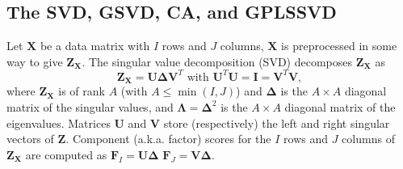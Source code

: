 \documentclass[12pt]{article}
\begin{document}
\hypertarget{the-svd-gsvd-ca-and-gplssvd}{%
\subsection{The SVD, GSVD, CA, and
GPLSSVD}\label{the-svd-gsvd-ca-and-gplssvd}}

\label{section:GSVDCA}

Let \({\mathbf X}\) be a data matrix with \(I\) rows and \(J\) columns,
\({\mathbf X}\) is preprocessed in some way to give
\({\mathbf Z}_{\mathbf X}\). The singular value decomposition (SVD)
decomposes \({\mathbf Z}_{\mathbf X}\) as \begin{equation}\label{eq:svd}
{\mathbf Z}_{\mathbf X} = 
{\mathbf U} {\boldsymbol \Delta} {\mathbf V}^{T}
\textrm{ with } {\mathbf U}^{T}{\mathbf U} 
= {\mathbf I} = {\mathbf V}^{T}{\mathbf V},
\end{equation} where \({\mathbf Z}_{\mathbf X}\) is of rank \(A\) (with
\(A \leq \min(I,J)\)) and \({\boldsymbol \Delta}\) is the \(A \times A\)
diagonal matrix of the singular values, and
\({\boldsymbol \Lambda} = {\boldsymbol \Delta}^2\) is the \(A \times A\)
diagonal matrix of the eigenvalues. Matrices \({\mathbf U}\) and
\({\mathbf V}\) store (respectively) the left and right singular vectors
of \({\mathbf Z}\). Component (a.k.a. factor) scores for the \(I\) rows
and \(J\) columns of \({\mathbf Z}_{\mathbf X}\) are computed as
\({\mathbf F}_{I} = {\mathbf U}{\boldsymbol \Delta}\)
\({\mathbf F}_{J} = {\mathbf V}{\boldsymbol \Delta}\).
\end{document}
